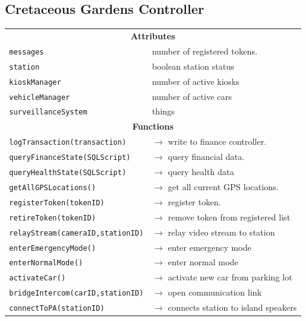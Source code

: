 \documentclass[12pt]{article}
\begin{document}
\subsection*{Cretaceous Gardens Controller}
\begin{table}[H]
\small
\begin{tabularx}{\hsize}{|X|X|}
    \hline
    \rowcolor{cgcgrey}
    \multicolumn{2}{|c|}{\textbf{CGC}} \\
    \hline
    \hline
    \multicolumn{2}{|c|}{\textbf{Attributes}}      \\
    \hline
    \texttt{messages} & number of registered tokens. \\
    \texttt{station} & boolean station status \\
    \texttt{kioskManager} & number of active kiosks  \\
    \texttt{vehicleManager} &  number of active cars\\
    \texttt{surveillanceSystem} & things \\
    \hline
    \multicolumn{2}{|c|}{\textbf{Functions}} \\
    \hline
    \texttt{logTransaction(transaction)} & $\rightarrow$ write to finance controller. \\
    \texttt{queryFinanceState(SQLScript)} & $\rightarrow$ query financial data. \\
    \texttt{queryHealthState(SQLScript)} & $\rightarrow$ query health data \\
    \texttt{getAllGPSLocations()} & $\rightarrow$ get all current GPS locations. \\
    \texttt{registerToken(tokenID) } & $\rightarrow$ register token. \\
    \texttt{retireToken(tokenID)} & $\rightarrow$  remove token from registered list\\
    \texttt{relayStream(cameraID,stationID)} & $\rightarrow$ relay video stream to station\\
    \texttt{enterEmergencyMode()} & $\rightarrow$ enter emergency mode\\
    \texttt{enterNormalMode()} & $\rightarrow$ enter normal mode\\
    \texttt{activateCar()} & $\rightarrow$ activate new car from parking lot\\
    \texttt{bridgeIntercom(carID,stationID)} & $\rightarrow$ open communication link\\
    \texttt{connectToPA(stationID)} & $\rightarrow$ connects station to island speakers\\
    \hline

\end{tabularx}
\end{table}
\end{document}
